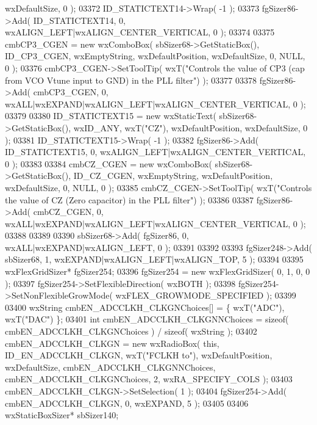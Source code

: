 \begin{DoxyCode}
       wxDefaultSize, 0 );
03372     ID_STATICTEXT14->Wrap( -1 );
03373     fgSizer86->Add( ID_STATICTEXT14, 0, wxALIGN\_LEFT|wxALIGN\_CENTER\_VERTICAL, 0 );
03374     
03375     cmbCP3_CGEN = \textcolor{keyword}{new} wxComboBox( sbSizer68->GetStaticBox(), ID_CP3_CGEN, wxEmptyString, wxDefaultPosition,
       wxDefaultSize, 0, NULL, 0 ); 
03376     cmbCP3_CGEN->SetToolTip( wxT(\textcolor{stringliteral}{"Controls the value of CP3 (cap from VCO Vtune input to GND) in the PLL
       filter"}) );
03377     
03378     fgSizer86->Add( cmbCP3_CGEN, 0, wxALL|wxEXPAND|wxALIGN\_LEFT|wxALIGN\_CENTER\_VERTICAL, 0 );
03379     
03380     ID_STATICTEXT15 = \textcolor{keyword}{new} wxStaticText( sbSizer68->GetStaticBox(), wxID\_ANY, wxT(\textcolor{stringliteral}{"CZ"}), wxDefaultPosition, 
      wxDefaultSize, 0 );
03381     ID_STATICTEXT15->Wrap( -1 );
03382     fgSizer86->Add( ID_STATICTEXT15, 0, wxALIGN\_LEFT|wxALIGN\_CENTER\_VERTICAL, 0 );
03383     
03384     cmbCZ_CGEN = \textcolor{keyword}{new} wxComboBox( sbSizer68->GetStaticBox(), ID_CZ_CGEN, wxEmptyString, wxDefaultPosition, 
      wxDefaultSize, 0, NULL, 0 ); 
03385     cmbCZ_CGEN->SetToolTip( wxT(\textcolor{stringliteral}{"Controls the value of CZ (Zero capacitor) in the PLL filter"}) );
03386     
03387     fgSizer86->Add( cmbCZ_CGEN, 0, wxALL|wxEXPAND|wxALIGN\_LEFT|wxALIGN\_CENTER\_VERTICAL, 0 );
03388     
03389     
03390     sbSizer68->Add( fgSizer86, 0, wxALL|wxEXPAND|wxALIGN\_LEFT, 0 );
03391     
03392     
03393     fgSizer248->Add( sbSizer68, 1, wxEXPAND|wxALIGN\_LEFT|wxALIGN\_TOP, 5 );
03394     
03395     wxFlexGridSizer* fgSizer254;
03396     fgSizer254 = \textcolor{keyword}{new} wxFlexGridSizer( 0, 1, 0, 0 );
03397     fgSizer254->SetFlexibleDirection( wxBOTH );
03398     fgSizer254->SetNonFlexibleGrowMode( wxFLEX\_GROWMODE\_SPECIFIED );
03399     
03400     wxString cmbEN\_ADCCLKH\_CLKGNChoices[] = \{ wxT(\textcolor{stringliteral}{"ADC"}), wxT(\textcolor{stringliteral}{"DAC"}) \};
03401     \textcolor{keywordtype}{int} cmbEN\_ADCCLKH\_CLKGNNChoices = \textcolor{keyword}{sizeof}( cmbEN\_ADCCLKH\_CLKGNChoices ) / \textcolor{keyword}{sizeof}( wxString );
03402     cmbEN_ADCCLKH_CLKGN = \textcolor{keyword}{new} wxRadioBox( \textcolor{keyword}{this}, ID_EN_ADCCLKH_CLKGN, wxT(\textcolor{stringliteral}{"FCLKH to"}), wxDefaultPosition, 
      wxDefaultSize, cmbEN\_ADCCLKH\_CLKGNNChoices, cmbEN\_ADCCLKH\_CLKGNChoices, 2, wxRA\_SPECIFY\_COLS );
03403     cmbEN_ADCCLKH_CLKGN->SetSelection( 1 );
03404     fgSizer254->Add( cmbEN_ADCCLKH_CLKGN, 0, wxEXPAND, 5 );
03405     
03406     wxStaticBoxSizer* sbSizer140;

\end{DoxyCode}
